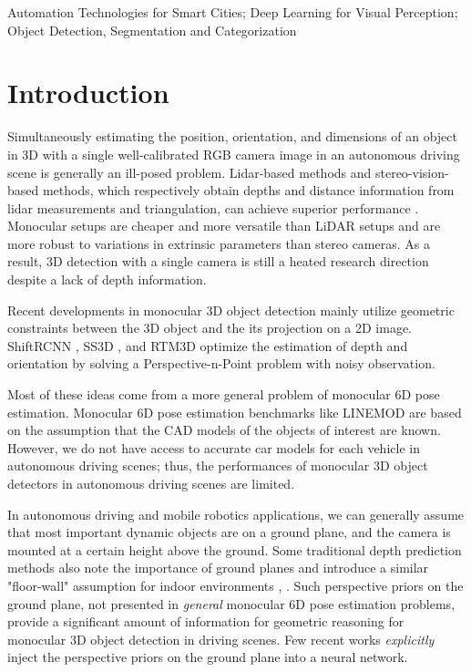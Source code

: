 \documentclass[letterpaper, 10 pt, journal, twoside]{IEEEtran}
\begin{document}
\begin{IEEEkeywords}
  Automation Technologies for Smart Cities; Deep Learning for Visual Perception; Object Detection, Segmentation and Categorization
\end{IEEEkeywords}





\IEEEpeerreviewmaketitle

\section{Introduction}

Simultaneously estimating the position, orientation, and dimensions of an object in 3D with a single well-calibrated RGB camera image in an autonomous driving scene is generally an ill-posed problem. 
Lidar-based methods and stereo-vision-based methods, which respectively obtain depths and distance information from lidar measurements and triangulation, can achieve superior performance \cite{Yun2018Focal}\cite{wang2020PointTrackNet}\cite{chen2019ImageDe}\cite{Li2019Stereo}. Monocular setups are cheaper and more versatile than LiDAR setups and are more robust to variations in extrinsic parameters than stereo cameras. 
 As a result, 3D detection with a single camera is still a heated research direction despite a lack of depth information.

Recent developments in monocular 3D object detection mainly utilize geometric constraints between the 3D object and the its projection on a 2D image. ShiftRCNN \cite{Li2019ShiftRCNN}, SS3D \cite{Jorgensen2019SS3D}, and RTM3D \cite{Li2020RTM3DRM} optimize the estimation of depth and orientation by solving a Perspective-n-Point problem with noisy observation.

Most of these ideas come from a more general problem of monocular 6D pose estimation. Monocular 6D pose estimation benchmarks like LINEMOD \cite{hinterstoisser2012linemod} are based on the assumption that the CAD models of the objects of interest are known. However, we do not have access to accurate car models for each vehicle in autonomous driving scenes; thus, the performances of monocular 3D object detectors in autonomous driving scenes are limited. 

In autonomous driving and mobile robotics applications, we can generally assume that most important dynamic objects are on a ground plane, and the camera is mounted at a certain height above the ground. Some traditional depth prediction methods also note the importance of ground planes and introduce a similar "floor-wall" assumption for indoor environments \cite{Delage2006FloorWall}, \cite{Chun2013FloorDetectionDepthEstimation}.
Such perspective priors on the ground plane, not presented in \textit{general} monocular 6D pose estimation problems, provide a significant amount of information for geometric reasoning for monocular 3D object detection in driving scenes.  
 Few recent works \textit{explicitly} inject the perspective priors on the ground plane into a neural network.
\end{document}
